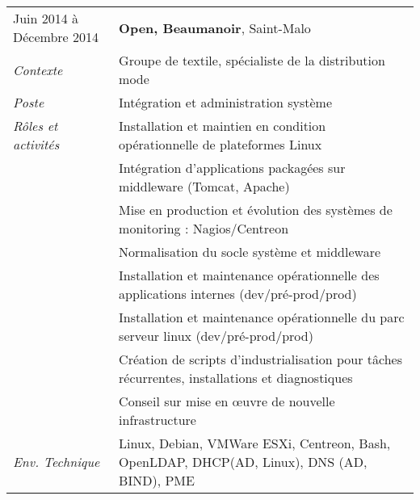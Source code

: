 \documentclass[a4paper,8pt]{article}
\begin{document}
\begin{tabular}{P{3.5cm}|p{13cm}}
Juin 2014 à Décembre 2014	& \textbf{Open, Beaumanoir}, Saint-Malo\\
\textsl{Contexte}		& Groupe de textile, spécialiste de la distribution mode\\
\textsl{Poste}			& Intégration et administration système\\
\textsl{Rôles et activités}	& Installation et maintien en condition opérationnelle de plateformes Linux\\
				& Intégration d'applications packagées sur middleware (Tomcat, Apache)\\
				& Mise en production et évolution des systèmes de monitoring : Nagios/Centreon\\
				& Normalisation du socle système et middleware\\
				& Installation et maintenance opérationnelle des applications internes (dev/pré-prod/prod)\\
				& Installation et maintenance opérationnelle du parc serveur linux (dev/pré-prod/prod)\\
				& Création de scripts d'industrialisation pour tâches récurrentes, installations et diagnostiques\\
				& Conseil sur mise en œuvre de nouvelle infrastructure\\
\textsl{Env. Technique}		& Linux, Debian, VMWare ESXi, Centreon, Bash, OpenLDAP, DHCP(AD, Linux), DNS (AD, BIND), PME\\
\end{tabular}
\end{document}
